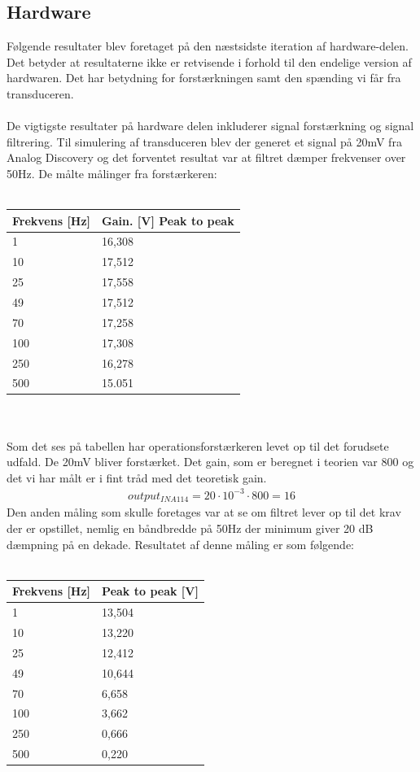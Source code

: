 \subsection{Hardware}
Følgende resultater blev foretaget på den næstsidste iteration af hardware-delen. Det betyder at resultaterne ikke er retvisende i forhold til den endelige version af hardwaren. Det har betydning for forstærkningen samt den spænding vi får fra transduceren. \\\\
De vigtigste resultater på hardware delen inkluderer signal forstærkning og signal filtrering. Til simulering af transduceren blev der generet et signal på 20mV fra Analog Discovery og det forventet resultat var at filtret dæmper frekvenser over 50Hz. De målte målinger fra forstærkeren: 
\\\\
\begin{tabular}{| l | l |} \hline
\textbf{Frekvens [Hz]} & \textbf{Gain. [V] Peak to peak}\\\hline
1 & 16,308 \\\hline 
10 & 17,512 \\\hline
25 & 17,558 \\\hline 
49 & 17,512\\\hline
70 & 17,258\\\hline 
100 & 17,308 \\\hline
250 & 16,278\\\hline
500 & 15.051\\\hline
\end{tabular}\\\\
Som det ses på tabellen har operationsforstærkeren levet op til det forudsete udfald. De 20mV bliver forstærket. Det gain, som er beregnet i teorien var 800 og det vi har målt er i fint tråd med det teoretisk gain.  
\begin{align}
output_{INA114}=20\cdot 10^{-3}\cdot 800=16
\end{align}
Den anden måling som skulle foretages var at se om filtret lever op til det krav der er opstillet, nemlig en båndbredde på 50Hz der minimum giver 20 dB dæmpning på en dekade. Resultatet af denne måling er som følgende:   \\\\
\begin{tabular}{| l | l |} \hline
\textbf{Frekvens [Hz]} & \textbf{Peak to peak [V]}\\\hline
1 & 13,504 \\\hline 
10 & 13,220 \\\hline
25 & 12,412 \\\hline 
49 & 10,644\\\hline
70 & 6,658 \\\hline 
100 & 3,662 \\\hline
250 & 0,666\\\hline
500 & 0,220\\\hline
\end{tabular}\\\\
